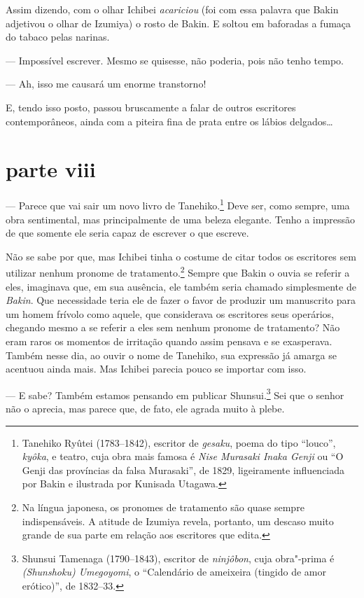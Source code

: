 Assim dizendo, com o olhar Ichibei \textit{acariciou} (foi com essa palavra que
Bakin adjetivou o olhar de Izumiya) o rosto de Bakin. E soltou em 
baforadas a fumaça do tabaco pelas narinas.

--- Impossível escrever. Mesmo se quisesse, não poderia, pois não tenho
tempo.

--- Ah, isso me causará um enorme transtorno!

E, tendo isso posto, passou bruscamente a falar de outros escritores contemporâneos, 
ainda com a piteira fina de prata entre os lábios delgados\ldots{}

\section*{parte viii}

--- Parece que vai sair um novo livro de Tanehiko.\footnote{ Tanehiko Ryûtei 
(1783--1842), escritor de \textit{gesaku}, poema do tipo
``louco'', \textit{kyôka}, e teatro, cuja obra mais famosa é \textit{Nise
Murasaki Inaka Genji} ou ``O Genji das províncias da falsa Murasaki'', de
1829, ligeiramente influenciada por Bakin e ilustrada por Kunisada Utagawa.} 
Deve ser, como sempre, uma obra sentimental, mas
principalmente de uma beleza elegante. Tenho a impressão de que somente
ele seria capaz de escrever o que escreve.

Não se sabe por que, mas Ichibei tinha o costume de citar todos os
escritores sem utilizar nenhum pronome de tratamento.\footnote{ Na
língua japonesa, os pronomes de tratamento são quase sempre
indispensáveis. A atitude de Izumiya revela, portanto, um descaso muito
grande de sua parte em relação aos escritores que edita. \par } Sempre
que Bakin o ouvia se referir a eles, imaginava que, em sua ausência,
ele também seria chamado simplesmente de \textit{Bakin}. Que necessidade teria
ele de fazer o favor de produzir um manuscrito para um homem frívolo
como aquele, que considerava os escritores seus operários, chegando
mesmo a se referir a eles sem nenhum pronome de tratamento? Não eram
raros os momentos de irritação quando assim pensava e se exasperava.
Também nesse dia, ao ouvir o nome de Tanehiko, sua expressão já amarga
se acentuou ainda mais. Mas Ichibei parecia pouco se importar com isso.

--- E sabe? Também estamos pensando em publicar Shunsui.\footnote{ Shunsui Tamenaga 
(1790--1843), escritor de \textit{ninjôbon}, cuja obra"-prima é 
\textit{(Shunshoku) Umegoyomi}, o ``Calendário de ameixeira (tingido de
amor erótico)'', de 1832--33.} Sei que o senhor não o aprecia, mas
parece que, de fato, ele agrada muito à plebe.

